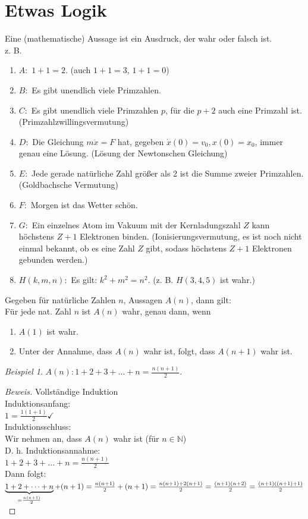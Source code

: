 \documentclass[12pt,a4paper,titlepage]{article} %
\theoremstyle{definition}
\theoremstyle{remark}
\newtheorem*{bsp}{Beispiel}
\newenvironment{bew}{\begin{proof}[Beweis]}{\end{proof}}
\newcommand{\gqq}[1]{\glqq{}#1\grqq{}}
\begin{document}
\section{Etwas Logik}
Eine (mathematische) Aussage ist ein Ausdruck, der wahr oder falsch ist.\\
z. B.
\begin{enumerate}
  \item \(A :\) \gqq{\(1+1=2\).}  (auch \gqq{\(1+1=3\)}, \gqq{\(1+1=0\)})
  \item \(B :\) \gqq{Es gibt unendlich viele Primzahlen.}
  \item \(C :\) \gqq{Es gibt unendlich viele Primzahlen \(p\), für die \(p + 2\) auch eine Primzahl ist.} (Primzahlzwillingsvermutung)
  \item \(D :\) \gqq{Die Gleichung \(m \ddot{x} = F\) hat, gegeben \(\dot{x}(0) = v_0, x(0) = x_0\), immer genau eine Lösung.} (Lösung der Newtonschen Gleichung)
  \item \(E :\) \gqq{Jede gerade natürliche Zahl größer als 2 ist die Summe zweier Primzahlen.} (Goldbachsche Vermutung)
  \item \(F :\) \gqq{Morgen ist das Wetter schön.}
  \item \(G :\) \gqq{Ein einzelnes Atom im Vakuum mit der Kernladungszahl \(Z\) kann höchstens \(Z+1\) Elektronen binden.} (Ionisierungsvermutung, es ist noch nicht einmal bekannt, ob es eine Zahl \(Z\) gibt, sodass höchstens \(Z+1\) Elektronen gebunden werden.)
  \item \(H(k,m,n) :\) \gqq{Es gilt: \(k^2 + m^2 = n^2\).} (z. B. \(H(3,4,5)\) ist wahr.)
\end{enumerate}
Gegeben für natürliche Zahlen \(n\), Aussagen \(A(n)\), dann gilt:\\
Für jede nat. Zahl \(n\) ist \(A(n)\) wahr, genau dann, wenn 
\begin{enumerate}
  \item \(A(1)\) ist wahr.
  \item Unter der Annahme, dass \(A(n)\) wahr ist, folgt, dass \(A(n+1)\) wahr ist.
\end{enumerate}
\begin{bsp}
	\(A(n): 1+2+3+\dots+n=\frac{n(n+1)}{2}\).
\end{bsp}
\begin{bew} 
	Vollständige Induktion\\
	Induktionsanfang:\\
	$1 = \frac{1(1+1)}{2} \checkmark$\\
	Induktionsschluss:\\
	Wir nehmen an, dass $A(n)$ wahr ist (für $n\in\mathbb{N}$)\\
	D. h. Induktionsannahme:\\
	$1+2+3+\dots+n=\frac{n(n+1)}{2}$\\
	Dann folgt:\\
	$\underbrace{1+2+\dots+n}_{=\frac{n(n+1)}{2}}+(n+1)=\frac{n(n+1)}{2}+(n+1) \\
	=\frac{n(n+1) + 2(n+1)}{2} = \frac{(n+1)(n+2)}{2} = \frac{(n+1)((n+1)+1)}{2}$
\end{bew}
\end{document}
